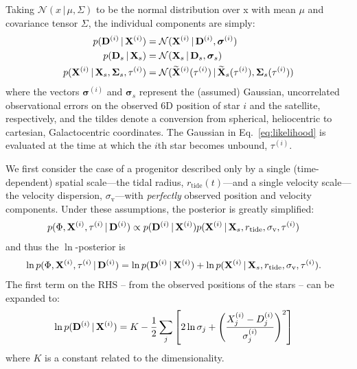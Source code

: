\documentclass[letterpaper,12pt,preprint]{aastex}
\newcommand{\given}{\,|\,}
\newcommand{\D}{{\bf D}}
\newcommand{\X}{{\bf X}}
\newcommand{\bSigma}{{\bf \Sigma}}
\newcommand{\bsigma}{\boldsymbol\sigma}
\begin{document}
Taking $\mathcal{N}(x \given \mu, \Sigma)$ to be the normal distribution over x with mean $\mu$ and covariance tensor $\Sigma$, the individual components are simply:
\begin{align}
	p(\D^{(i)} \given \X^{(i)}) &= \mathcal{N}(\X^{(i)} \given \D^{(i)}, \bsigma^{(i)})\\
	p(\D_s \given \X_s) &= \mathcal{N}(\X_s \given \D_s, \bsigma_s)\\
	p(\X^{(i)} \given \X_s, \bSigma_s, \tau^{(i)}) &= \mathcal{N}(\widetilde{\X}^{(i)}(\tau^{(i)}) \given \widetilde{\X}_s(\tau^{(i)}), \bSigma_s(\tau^{(i)}))\label{eq:likelihood}
\end{align}
where the vectors $\bsigma^{(i)}$ and $\bsigma_s$ represent the (assumed) Gaussian, uncorrelated observational errors on the observed 6D position of star $i$ and the satellite, respectively, and the tildes denote a conversion from spherical, heliocentric to cartesian, Galactocentric coordinates. The Gaussian in Eq.~\ref{eq:likelihood} is evaluated at the time at which the $i$th star becomes unbound, $\tau^{(i)}$.

We first consider the case of a progenitor described only by a single (time-dependent) spatial scale---the tidal radius, $r_{\mathrm{tide}}(t)$---and a single velocity scale---the velocity dispersion, $\sigma_\mathrm{v}$---with \emph{perfectly} observed position and velocity components. Under these assumptions, the posterior is greatly simplified:
\begin{align}
	p(\Phi, \X^{(i)}, \tau^{(i)} \given \D^{(i)}) &\propto 
		p(\D^{(i)} \given \X^{(i)}) p(\X^{(i)} \given \X_s, r_{\mathrm{tide}}, \sigma_\mathrm{v}, \tau^{(i)})\label{eq:posterior}
\end{align}
and thus the $\ln$-posterior is
\begin{align}
	\ln p(\Phi, \X^{(i)}, \tau^{(i)} \given \D^{(i)}) &= \ln p(\D^{(i)} \given \X^{(i)}) + \ln p(\X^{(i)} \given \X_s, r_{\mathrm{tide}}, \sigma_\mathrm{v}, \tau^{(i)}).
\end{align}
The first term on the RHS -- from the observed positions of the stars	-- can be expanded to:
\begin{align}
	\ln p(\D^{(i)} \given \X^{(i)}) &= K - \frac{1}{2}\sum_j \left[ 2\ln\sigma_j + \left(\frac{X^{(i)}_j-D^{(i)}_j}{\sigma^{(i)}_j}\right)^2\right]
\end{align}
where $K$ is a constant related to the dimensionality. 
 
\end{document}
